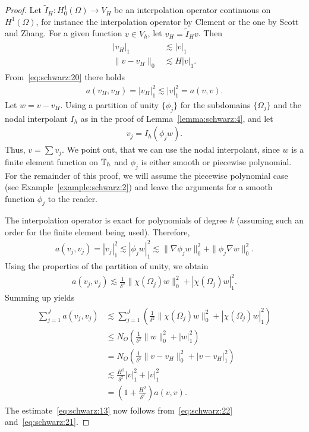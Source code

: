 \begin{proof}
  Let $\tilde I_H: H^1_0(\Omega) \to V_H$ be an interpolation operator
  continuous on $H^1(\Omega)$, for instance the interpolation operator
  by Clement or the one by Scott and Zhang. For a given function
  $v\in V_h$, let $v_H = \tilde I_H v$. Then
  \begin{gather}
    \label{eq:schwarz:20}
    \begin{split}
      |v_H|_1 &\lesssim |v|_1 \\
      \|v-v_H\|_0 &\lesssim H |v|_1.
    \end{split}
  \end{gather}
  From~\eqref{eq:schwarz:20} there holds
  \begin{gather}
    \label{eq:schwarz:22}
    a(v_H,v_H) = |v_H|_1^2 \lesssim |v|_1^2 = a(v,v).
  \end{gather}
  Let $w=v-v_H$. Using a partition of unity $\{\phi_j\}$ for the
  subdomains $\{\Omega_j\}$ and the nodal interpolant $I_h$ as in the
  proof of Lemma~\ref{lemma:schwarz:4}, and let
  \begin{gather*}
    v_j = I_h(\phi_j w).
  \end{gather*}
  Thus, $v = \sum v_j$. We point out, that we can use the nodal
  interpolant, since $w$ is a finite element function on $\mathbb T_h$ and
  $\phi_j$ is either smooth or piecewise polynomial. For the remainder
  of this proof, we will assume the piecewise polynomial case (see
  Example~\ref{example:schwarz:2}) and leave the arguments for a
  smooth function $\phi_j$ to the reader.
  
  The interpolation operator is exact for polynomials of degree $k$
  (assuming such an order for the finite element being
  used). Therefore,
  \begin{gather*}
    a(v_j,v_j) = |v_j|_1^2 \lesssim |\phi_j w|_1^2
    \lesssim \|\nabla \phi_j w\|_0^2 + \|\phi_j \nabla w\|_0^2.
  \end{gather*}
  Using the properties of the partition of unity, we obtain
  \begin{gather*}
    a(v_j,v_j) \lesssim \frac1{\delta^2} \|\chi(\Omega_j) w\|_0^2 + |\chi(\Omega_j)w|_1^2.
  \end{gather*}
  Summing up yields
  \begin{gather}
    \label{eq:schwarz:21}
    \begin{split}
      \sum_{j=1}^J a(v_j, v_j)
      &\lesssim \sum_{j=1}^J \left(\frac1{\delta^2} \|\chi(\Omega_j)
        w\|_0^2 + |\chi(\Omega_j)w|_1^2\right) \\
      &\le N_O \left(\frac1{\delta^2}\|w\|_0^2 + |w|_1^2\right) \\
      &=  N_O \left(\frac1{\delta^2} \|v-v_H\|_0^2 + |v-v_H|_1^2\right)
      \\
      & \lesssim \frac{H^2}{\delta^2} |v|_1^2 + |v|_1^2 \\
      &= \left(1+\frac{H^2}{\delta^2}\right) a(v,v).      
    \end{split}
  \end{gather}
  The estimate~\eqref{eq:schwarz:13} now follows
  from~\eqref{eq:schwarz:22} and~\eqref{eq:schwarz:21}.
\end{proof}

